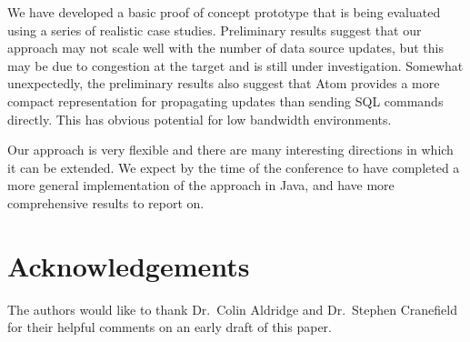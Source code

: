 \documentclass{CRPITStyle}
\begin{document}
We have developed a basic proof of concept prototype that is being
evaluated using a series of realistic case studies. Preliminary results
suggest that our approach may not scale well with the number of data
source updates, but this may be due to congestion at the target and is
still under investigation. Somewhat unexpectedly, the preliminary
results also suggest that Atom provides a more compact representation
for propagating updates than sending SQL commands directly. This has
obvious potential for low bandwidth environments.

Our approach is very flexible and there are many interesting directions
in which it can be extended. We expect by the time of the conference to
have completed a more general implementation of the approach in Java,
and have more comprehensive results to report on.



\section*{Acknowledgements}
\label{sec-acknowledgements}

The authors would like to thank Dr.\ Colin Aldridge and Dr.\ Stephen
Cranefield for their helpful comments on an early draft of this paper.




\end{document}
